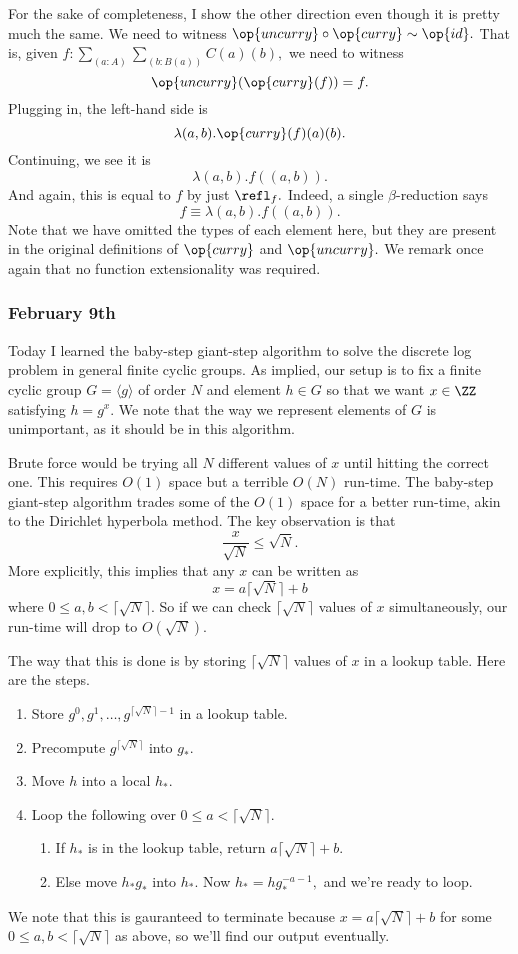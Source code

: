 For the sake of completeness, I show the other direction even though it is pretty much the same. We need to witness $\op{uncurry}\circ\op{curry}\sim\op{id}.$ That is, given $f:\sum_{(a:A)}\sum_{(b:B(a))}C(a)(b),$ we need to witness
\[\op{uncurry}(\op{curry}(f))=f.\]
Plugging in, the left-hand side is
\[\lambda(a,b).\op{curry}(f)(a)(b).\]
Continuing, we see it is
\[\lambda(a,b).f((a,b)).\]
And again, this is equal to $f$ by just $\refl_f.$ Indeed, a single $\beta$-reduction says
\[f\equiv\lambda(a,b).f((a,b)).\]
Note that we have omitted the types of each element here, but they are present in the original definitions of $\op{curry}$ and $\op{uncurry}.$ We remark once again that no function extensionality was required.

\subsubsection{February 9th}
Today I learned the baby-step giant-step algorithm to solve the discrete log problem in general finite cyclic groups. As implied, our setup is to fix a finite cyclic group $G=\langle g\rangle$ of order $N$ and element $h\in G$ so that we want $x\in\ZZ$ satisfying $h=g^x.$ We note that the way we represent elements of $G$ is unimportant, as it should be in this algorithm.

Brute force would be trying all $N$ different values of $x$ until hitting the correct one. This requires $O(1)$ space but a terrible $O(N)$ run-time. The baby-step giant-step algorithm trades some of the $O(1)$ space for a better run-time, akin to the Dirichlet hyperbola method. The key observation is that
\[\frac x{\sqrt N}\le\sqrt N.\]
More explicitly, this implies that any $x$ can be written as
\[x=a\lceil\sqrt N\rceil+b\]
where $0\le a,b<\lceil\sqrt N\rceil.$ So if we can check $\lceil\sqrt N\rceil$ values of $x$ simultaneously, our run-time will drop to $O(\sqrt N).$

The way that this is done is by storing $\lceil\sqrt N\rceil$ values of $x$ in a lookup table. Here are the steps.
\begin{enumerate}
    \item Store $g^0,g^1,\ldots,g^{\lceil\sqrt N\rceil-1}$ in a lookup table.
    \item Precompute $g^{\lceil\sqrt N\rceil}$ into $g_*.$
    \item Move $h$ into a local $h_*.$
    \item Loop the following over $0\le a<\lceil\sqrt N\rceil.$
    \begin{enumerate}
        \item If $h_*$ is in the lookup table, return $a\lceil\sqrt N\rceil+b.$
        \item Else move $h_*g_*$ into $h_*.$ Now $h_*=hg_*^{-a-1},$ and we're ready to loop.
    \end{enumerate}
\end{enumerate}
We note that this is gauranteed to terminate because $x=a\lceil\sqrt N\rceil+b$ for some $0\le a,b<\lceil\sqrt N\rceil$ as above, so we'll find our output eventually.


